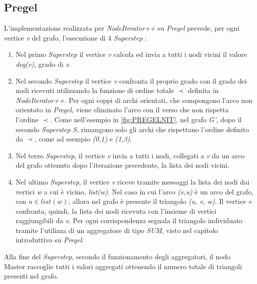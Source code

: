 \documentclass[LaM,binding=0.6cm]{sapthesis}
\begin{document}
\subsection{Pregel}

L'implementazione realizzata per \textit{NodeIterator++} su \textit{Pregel} prevede, per ogni vertice \textit{v} del grafo, l'esecuzione di 4 \textit{Superstep} :
\begin{enumerate}
\item Nel primo \textit{Superstep} il vertice \textit{v} calcola ed invia a tutti i nodi vicini il valore \textit{deg(v)}, grado di \textit{v}. 

\item Nel secondo \textit{Superstep} il vertice \textit{v} confronta il proprio grado con il grado dei nodi ricevuti utilizzando la funzione di ordine totale $\prec$ definita in \textit{NodeIterator++}. 
Per ogni coppi di archi orientati, che compongono l'arco non orientato in \textit{Pregel}, viene eliminato l'arco con il verso che non rispetta l'ordine $\prec$.
Come nell'esempio in \ref{fig:PREGELNIT}, nel grafo \textit{G'}, dopo il secondo \textit{Superstep S}, rimangono solo gli archi che rispettano l'ordine definito da $\prec$, come ad esempio \textit{(0,1)} e \textit{(1,3)}.

\item Nel terzo \textit{Superstep}, il vertice \textit{v} invia a tutti i nodi, collegati a \textit{v} da un arco del grafo ottenuto dopo l'iterazione precedente, la lista dei nodi vicini.

\item Nel ultimo \textit{Superstep}, il vertice \textit{v} riceve tramite messaggi la lista dei nodi dai vertici \textit{w} a cui è vicino, \textit{list(w)}. Nel caso in cui l'arco \textit{(v,u)} è un arco del grafo, con \textit{$u \in list(w)$}, allora nel grafo è presente il triangolo \textit{(u, v, w)}. 
Il vertice \textit{v} confronta, quindi, la lista dei nodi ricevuta con l'insieme di vertici raggiungibili da \textit{v}. 
Per ogni corrispondenza segnala il triangolo individuato tramite l'utilizza di un aggregatore di tipo \textit{SUM}, visto nel capitolo introduttivo su \textit{Pregel}.
\end{enumerate}

Alla fine del \textit{Superstep}, secondo il funzionamento degli aggregatori, il nodo Master raccoglie tutti i valori aggregati ottenendo il numero totale di triangoli presenti nel grafo.

	
\end{document}
